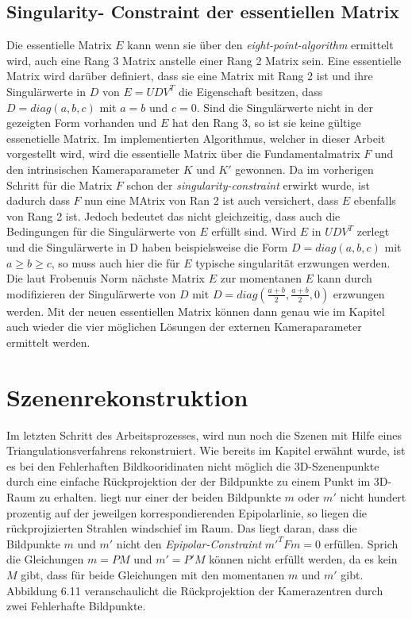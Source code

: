 \pagebreak

\subsection{Singularity- Constraint der essentiellen Matrix}

Die essentielle Matrix $E$ kann wenn sie über den \textit{eight-point-algorithm} ermittelt wird, auch eine Rang 3 Matrix anstelle einer Rang 2 Matrix sein. Eine essentielle Matrix wird darüber definiert, dass sie eine Matrix mit Rang 2 ist und ihre Singulärwerte in $D$ von $E = UDV^T$ die Eigenschaft besitzen, dass $ D = diag(a,b,c)$ mit $a=b$ und $c=0$. Sind die Singulärwerte nicht in der gezeigten Form vorhanden und $E$ hat den Rang 3, so ist sie keine gültige essenetielle Matrix\cite{HZ}. Im implementierten Algorithmus, welcher in dieser Arbeit vorgestellt wird, wird die essentielle Matrix über die Fundamentalmatrix $F$ und den intrinsischen Kameraparameter $K$ und $K'$ gewonnen. Da im vorherigen Schritt für die Matrix $F$ schon der \textit{singularity-constraint} erwirkt wurde, ist dadurch dass $F$ nun eine MAtrix von Ran 2 ist auch versichert, dass $E$ ebenfalls von Rang 2 ist. Jedoch bedeutet das nicht gleichzeitig, dass auch die Bedingungen für die Singulärwerte von $E$ erfüllt sind. Wird $E$ in $UDV^T$ zerlegt und die Singulärwerte in D haben beispielsweise die Form $D= diag(a,b,c)$ mit $a \geq b \geq c $, so muss auch hier die für $E$ typische singularität erzwungen werden. Die laut Frobenuis Norm nächste Matrix $E$ zur momentanen $E$ kann durch modifizieren der Singulärwerte von $D$ mit $D=diag(\frac{a+b}{2},\frac{a+b}{2},0)$ erzwungen werden\cite{HZ}. Mit der neuen essentiellen Matrix können dann genau wie im Kapitel  auch wieder die vier möglichen Lösungen der externen Kameraparameter ermittelt werden. 

\section{Szenenrekonstruktion}

Im letzten Schritt des Arbeitsprozesses, wird nun noch die Szenen mit Hilfe eines Triangulationsverfahrens rekonstruiert. Wie bereits im Kapitel  erwähnt wurde, ist es bei den Fehlerhaften Bildkooridinaten nicht möglich die 3D-Szenenpunkte durch eine einfache Rückprojektion der der Bildpunkte zu einem Punkt im 3D-Raum zu erhalten. liegt nur einer der beiden Bildpunkte $m$ oder $m'$ nicht hundert prozentig auf der jeweilgen korrespondierenden Epipolarlinie, so liegen die rückprojizierten Strahlen windschief im Raum. Das liegt daran, dass die Bildpunkte $m$ und $m'$ nicht den \textit{Epipolar-Constraint} $m'^T F m = 0$ erfüllen. Sprich die Gleichungen $m = PM$ und $m' = P'M$ können nicht erfüllt werden, da es kein $M$ gibt, dass für beide Gleichungen mit den momentanen $m$ und $m'$ gibt. Abbildung 6.11 veranschaulicht die Rückprojektion der Kamerazentren durch zwei Fehlerhafte Bildpunkte. 

